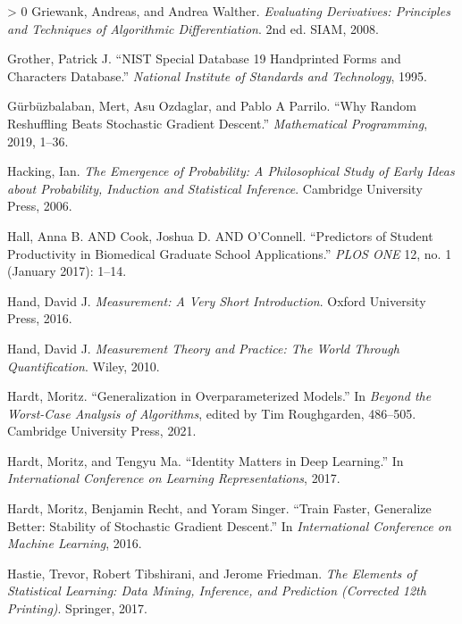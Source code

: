 \documentclass{tufte-book}
\newlength{\cslhangindent}
\newenvironment{CSLReferences}[3] %
 {%
  \setlength{\parindent}{0pt}
  \ifodd #1 \everypar{\setlength{\hangindent}{\cslhangindent}}\ignorespaces\fi
  \ifnum #2 > 0
  \setlength{\parskip}{#3\baselineskip}
  \fi
 }%
 {
 }
\begin{document}
\begin{CSLReferences}{1}{0}
\leavevmode\hypertarget{ref-griewank2008evaluating}{}%
Griewank, Andreas, and Andrea Walther. \emph{Evaluating Derivatives:
Principles and Techniques of Algorithmic Differentiation}. 2nd ed. SIAM,
2008.

\leavevmode\hypertarget{ref-grother1995nist}{}%
Grother, Patrick J. {``NIST Special Database 19 Handprinted Forms and
Characters Database.''} \emph{National Institute of Standards and
Technology}, 1995.

\leavevmode\hypertarget{ref-gurbuzbalaban2019random}{}%
Gürbüzbalaban, Mert, Asu Ozdaglar, and Pablo A Parrilo. {``Why Random
Reshuffling Beats Stochastic Gradient Descent.''} \emph{Mathematical
Programming}, 2019, 1--36.

\leavevmode\hypertarget{ref-hacking2006emergence}{}%
Hacking, Ian. \emph{The Emergence of Probability: A Philosophical Study
of Early Ideas about Probability, Induction and Statistical Inference}.
Cambridge University Press, 2006.

\leavevmode\hypertarget{ref-hall2017predictors}{}%
Hall, Anna B. AND Cook, Joshua D. AND O'Connell. {``Predictors of
Student Productivity in Biomedical Graduate School Applications.''}
\emph{PLOS ONE} 12, no. 1 (January 2017): 1--14.

\leavevmode\hypertarget{ref-hand2016measurement}{}%
Hand, David J. \emph{Measurement: A Very Short Introduction}. Oxford
University Press, 2016.

\leavevmode\hypertarget{ref-hand2010measurement}{}%
Hand, David J. \emph{Measurement Theory and Practice: The World Through
Quantification}. Wiley, 2010.

\leavevmode\hypertarget{ref-hardt2021generalization}{}%
Hardt, Moritz. {``Generalization in Overparameterized Models.''} In
\emph{Beyond the Worst-Case Analysis of Algorithms}, edited by Tim
Roughgarden, 486--505. Cambridge University Press, 2021.

\leavevmode\hypertarget{ref-hardt2017identity}{}%
Hardt, Moritz, and Tengyu Ma. {``Identity Matters in Deep Learning.''}
In \emph{International Conference on Learning Representations}, 2017.

\leavevmode\hypertarget{ref-hardt2016train}{}%
Hardt, Moritz, Benjamin Recht, and Yoram Singer. {``Train Faster,
Generalize Better: Stability of Stochastic Gradient Descent.''} In
\emph{International Conference on Machine Learning}, 2016.

\leavevmode\hypertarget{ref-hastie2017elements}{}%
Hastie, Trevor, Robert Tibshirani, and Jerome Friedman. \emph{The
Elements of Statistical Learning: Data Mining, Inference, and Prediction
(Corrected 12th Printing)}. Springer, 2017.


\end{CSLReferences}
\end{document}
